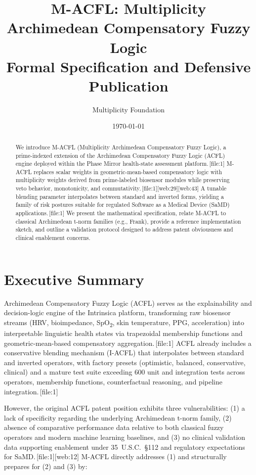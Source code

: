 \documentclass[11pt]{article}
\title{M-ACFL: Multiplicity Archimedean Compensatory Fuzzy Logic\\
\large Formal Specification and Defensive Publication}
\author{Multiplicity Foundation}
\date{\today}
\begin{document}
\maketitle

\begin{abstract}
We introduce M-ACFL (Multiplicity Archimedean Compensatory Fuzzy Logic), a prime-indexed extension of the Archimedean Compensatory Fuzzy Logic (ACFL) engine deployed within the Phase Mirror health-state assessment platform.\,[file:1] 
M-ACFL replaces scalar weights in geometric-mean-based compensatory logic with multiplicity weights derived from prime-labeled biosensor modules while preserving veto behavior, monotonicity, and commutativity.\,[file:1][web:29][web:43] 
A tunable blending parameter interpolates between standard and inverted forms, yielding a family of risk postures suitable for regulated Software as a Medical Device (SaMD) applications.\,[file:1] 
We present the mathematical specification, relate M-ACFL to classical Archimedean t-norm families (e.g., Frank), provide a reference implementation sketch, and outline a validation protocol designed to address patent obviousness and clinical enablement concerns.
\end{abstract}

\section{Executive Summary}

Archimedean Compensatory Fuzzy Logic (ACFL) serves as the explainability and decision-logic engine of the Intrinsica platform, transforming raw biosensor streams (HRV, bioimpedance, SpO\textsubscript{2}, skin temperature, PPG, acceleration) into interpretable linguistic health states via trapezoidal membership functions and geometric-mean-based compensatory aggregation.\,[file:1] 
ACFL already includes a conservative blending mechanism (I-ACFL) that interpolates between standard and inverted operators, with factory presets (optimistic, balanced, conservative, clinical) and a mature test suite exceeding 600 unit and integration tests across operators, membership functions, counterfactual reasoning, and pipeline integration.\,[file:1] 

However, the original ACFL patent position exhibits three vulnerabilities: (1) a lack of specificity regarding the underlying Archimedean t-norm family, (2) absence of comparative performance data relative to both classical fuzzy operators and modern machine learning baselines, and (3) no clinical validation data supporting enablement under 35~U.S.C.~\S112 and regulatory expectations for SaMD.\,[file:1][web:12] 
M-ACFL directly addresses (1) and structurally prepares for (2) and (3) by:
\end{document}

